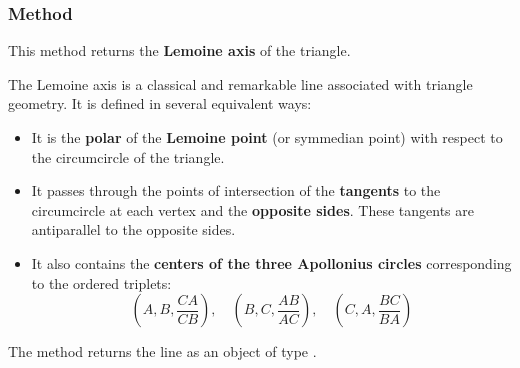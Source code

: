 \subsubsection{Method } %
\label{ssub:method_triangle_lemoine__line}

This method returns the \textbf{Lemoine axis} of the triangle.

\medskip
\noindent
The Lemoine axis is a classical and remarkable line associated with triangle geometry. It is defined in several equivalent ways:
\begin{itemize}
  \item It is the \textbf{polar} of the \textbf{Lemoine point} (or symmedian point) with respect to the circumcircle of the triangle.
  \item It passes through the points of intersection of the \textbf{tangents} to the circumcircle at each vertex and the \textbf{opposite sides}. These tangents are antiparallel to the opposite sides.
  \item It also contains the \textbf{centers of the three Apollonius circles} corresponding to the ordered triplets:
  \[
    (A, B, \frac{CA}{CB}), \quad (B, C, \frac{AB}{AC}), \quad (C, A, \frac{BC}{BA})
  \]
\end{itemize}

\noindent
The method  returns the line as an object of type .

\vspace{1em}

\begin{minipage}{.5\textwidth}
\begin{center}
\end{center}

\end{minipage}
\begin{minipage}{.5\textwidth}
\begin{tkzexample}
\end{tkzexample}
\end{minipage}


